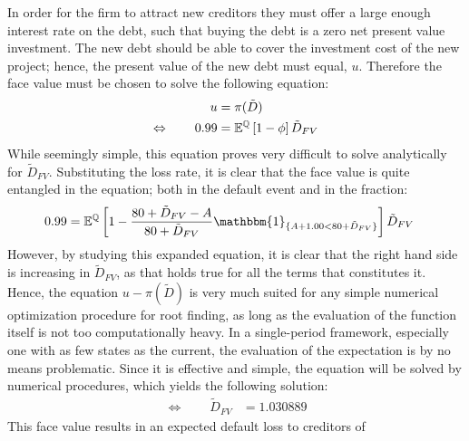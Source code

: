 \documentclass[main.tex]{subfiles}
\begin{document}
        In order for the firm to attract new creditors they must offer a large enough interest rate on the debt, 
        such that buying the debt is a zero net present value investment.
        The new debt should be able to cover the investment cost of the new project;
        hence, the present value of the new debt must equal, $u$.
        Therefore the face value must be chosen to solve the following equation:
            \begin{align}
                u &= \pi(\tilde{D}) \\
                \Leftrightarrow  \qquad
                \num{0.99} &= \mathbb{E}^{\mathbb{Q}}\left[1 - \phi\right] \tilde{D}_{FV}
            \end{align}
        While seemingly simple, this equation proves very difficult to solve analytically for $\tilde{D}_{FV}$.
        Substituting the loss rate, it is clear that the face value is quite entangled in the equation;
        both in the default event and in the fraction:
            \begin{align}
                \num{0.99}
                &= 
                \mathbb{E}^{\rnmeasure}\left[
                    1 
                    - 
                    \frac{
                        \num{80} + \tilde{D}_{FV} - A
                    }{
                        \num{80} + \tilde{D}_{FV}
                    }
                    \mathbbm{1}_{\{A + 1.00 < \num{80} + \tilde{D}_{FV}\}} 
                \right] 
                \tilde{D}_{FV} 
            \end{align}
        However, by studying this expanded equation, it is clear that the right hand side 
        is increasing in $\tilde{D}_{FV}$, as that holds true for all the terms that constitutes it.
        Hence, the equation $u - \pi(\tilde{D})$ is very much suited for any simple numerical optimization procedure
        for root finding, as long as the evaluation of the function itself is not too computationally heavy.
        In a single-period framework, especially one with as few states as the current,
        the evaluation of the expectation is by no means problematic.
        Since it is effective and simple, the equation will be solved by numerical procedures, 
        which yields the following solution:
            \begin{align}
                \Leftrightarrow  \qquad
                \tilde{D}_{FV} &= \num{1.030889}
            \end{align}
        This face value results in an expected default loss to creditors of 
\end{document}
